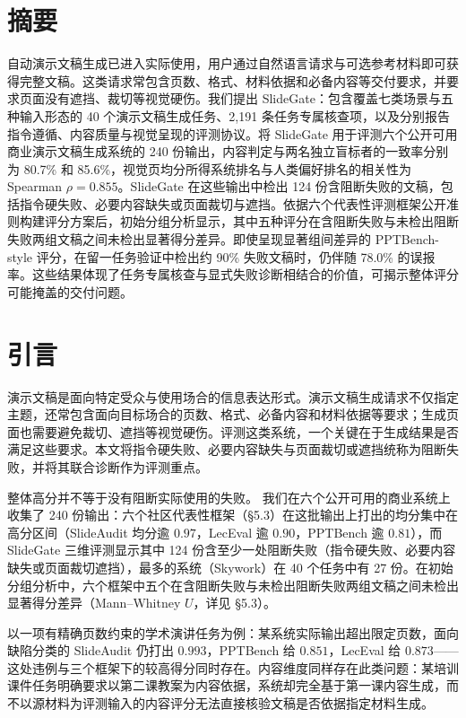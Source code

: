 \section*{摘要}\label{ux6458ux8981}

自动演示文稿生成已进入实际使用，用户通过自然语言请求与可选参考材料即可获得完整文稿。这类请求常包含页数、格式、材料依据和必备内容等交付要求，并要求页面没有遮挡、裁切等视觉硬伤。我们提出 SlideGate：包含覆盖七类场景与五种输入形态的 40 个演示文稿生成任务、2,191 条任务专属核查项，以及分别报告指令遵循、内容质量与视觉呈现的评测协议。将 SlideGate 用于评测六个公开可用商业演示文稿生成系统的 240 份输出，内容判定与两名独立盲标者的一致率分别为 80.7\% 和 85.6\%，视觉页均分所得系统排名与人类偏好排名的相关性为 Spearman \(\rho=0.855\)。SlideGate 在这些输出中检出 124 份含阻断失败的文稿，包括指令硬失败、必要内容缺失或页面裁切与遮挡。依据六个代表性评测框架公开准则构建评分方案后，初始分组分析显示，其中五种评分在含阻断失败与未检出阻断失败两组文稿之间未检出显著得分差异。即使呈现显著组间差异的 PPTBench-style 评分，在留一任务验证中检出约 90\% 失败文稿时，仍伴随 78.0\% 的误报率。这些结果体现了任务专属核查与显式失败诊断相结合的价值，可揭示整体评分可能掩盖的交付问题。

\section{引言}\label{ux5f15ux8a00}

演示文稿是面向特定受众与使用场合的信息表达形式。演示文稿生成请求不仅指定主题，还常包含面向目标场合的页数、格式、必备内容和材料依据等要求；生成页面也需要避免裁切、遮挡等视觉硬伤。评测这类系统，一个关键在于生成结果是否满足这些要求。本文将指令硬失败、必要内容缺失与页面裁切或遮挡统称为阻断失败，并将其联合诊断作为评测重点。

整体高分并不等于没有阻断实际使用的失败。 我们在六个公开可用的商业系统上收集了 240 份输出：六个社区代表性框架（§5.3）在这批输出上打出的均分集中在高分区间（SlideAudit 均分逾 \(0.97\)，LecEval 逾 \(0.90\)，PPTBench 逾 \(0.81\)），而 SlideGate 三维评测显示其中 124 份含至少一处阻断失败（指令硬失败、必要内容缺失或页面裁切遮挡），最多的系统（Skywork）在 40 个任务中有 27 份。在初始分组分析中，六个框架中五个在含阻断失败与未检出阻断失败两组文稿之间未检出显著得分差异（Mann--Whitney \(U\)，详见 §5.3）。

以一项有精确页数约束的学术演讲任务为例：某系统实际输出超出限定页数，面向缺陷分类的 SlideAudit 仍打出 \(0.993\)，PPTBench 给 \(0.851\)，LecEval 给 \(0.873\)------这处违例与三个框架下的较高得分同时存在。内容维度同样存在此类问题：某培训课件任务明确要求以第二课教案为内容依据，系统却完全基于第一课内容生成，而不以源材料为评测输入的内容评分无法直接核验文稿是否依据指定材料生成。


